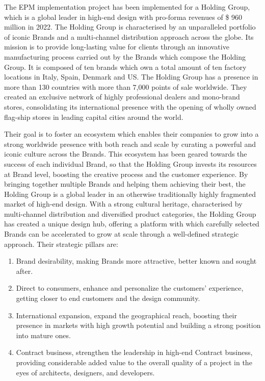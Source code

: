 \documentclass[12pt,a4paper,openright,twoside]{book}
\begin{document}
The EPM implementation project has been implemented for a Holding Group, which is a global leader in high-end design with pro-forma revenues of \$ 960 million in 2022.
%
The Holding Group is characterised by an unparalleled portfolio of iconic Brands and a multi-channel distribution approach across the globe.
%
Its mission is to provide long-lasting value for clients through an innovative manufacturing process carried out by the Brands which compose the Holding Group.
%
It is composed of ten brands which own a total amount of ten factory locations in Italy, Spain, Denmark and US.
%
The Holding Group has a presence in more than 130 countries with more than 7,000 points of sale worldwide. 
%
They created an exclusive network of highly professional dealers and mono-brand stores, consolidating its international presence with the opening of wholly owned flag-ship stores in leading capital cities around the world.

Their goal is to foster an ecosystem which enables their companies to grow into a strong worldwide presence with both reach and scale by curating a powerful and iconic culture across the Brands.
%
This ecosystem has been geared towards the success of each individual Brand, so that the Holding Group invests its resources at Brand level, boosting the creative process and the customer experience.
%
By bringing together multiple Brands and helping them achieving their best, the Holding Group is a global leader in an otherwise traditionally highly fragmented market of high-end design. 
%
With a strong cultural heritage, characterised by multi-channel distribution and diversified product categories, the Holding Group has created a unique design hub, offering a platform with which carefully selected Brands can be accelerated to grow at scale through a well-defined strategic approach.
%
Their strategic pillars are:

\begin{enumerate}
    \item Brand desirability, making Brands more attractive, better known and sought after.
    \item Direct to consumers, enhance and personalize the customers’ experience, getting closer to end customers and the design community.
    \item International expansion, expand the geographical reach, boosting their presence in markets with high growth potential and building a strong position into mature ones.
    \item Contract business, strengthen the leadership in high-end Contract business, providing considerable added value to the overall quality of a project in the eyes of architects, designers, and developers.
\end{enumerate}
\end{document}
